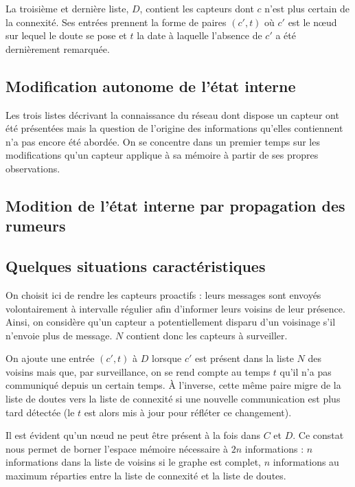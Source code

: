 \documentclass[10pt]{article}
\begin{document}
\begin{multicols}{2}
La troisième et dernière liste, $D$, contient les capteurs dont $c$
n'est plus certain de la connexité. Ses entrées prennent la forme de
paires $(c',t)$ o\`u $c'$ est le n\oe ud sur lequel le doute se pose
et $t$ la date à laquelle l'absence de $c'$ a été dernièrement
remarquée.

\subsection*{Modification autonome de l'état interne}

Les trois listes décrivant la connaissance du réseau dont dispose un
capteur ont été présentées mais la question de l'origine des
informations qu'elles contiennent n'a pas encore été abordée. On se
concentre dans un premier temps sur les modifications qu'un capteur
applique à sa mémoire à partir de ses propres observations.



\subsection*{Modition de l'état interne par propagation des rumeurs}

\subsection*{Quelques situations caractéristiques}

On choisit ici de rendre les capteurs proactifs : leurs messages sont
envoyés volontairement à intervalle régulier afin d'informer leurs
voisins de leur présence. Ainsi, on considère qu'un capteur a
potentiellement disparu d'un voisinage s'il n'envoie plus de
message. $N$ contient donc les capteurs à surveiller.

On ajoute une entrée $(c',t)$ à $D$ lorsque $c'$ est présent dans la
liste $N$ des voisins mais que, par surveillance, on se rend compte au
temps $t$ qu'il n'a pas communiqué depuis un certain temps. \`A
l'inverse, cette même paire migre de la liste de doutes vers la liste
de connexité si une nouvelle communication est plus tard détectée (le
$t$ est alors mis à jour pour réfléter ce changement).

Il est évident qu'un n\oe ud ne peut être présent à la fois dans $C$
et $D$. Ce constat nous permet de borner l'espace mémoire nécessaire à
$2n$ informations : $n$ informations dans la liste de voisins si le
graphe est complet, $n$ informations au maximum réparties entre la
liste de connexité et la liste de doutes.


\end{multicols}
\end{document}
